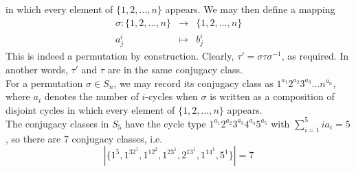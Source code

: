 \documentclass[a4paper]{article}
\begin{document}
\begin{ans}
in which every element of $\{1,2,\dots,n\}$ appears. We may then define a mapping 
\begin{eqnarray}
\sigma:\{1,2,\dots,n\}&\rightarrow&\{1,2,\dots,n\}\nonumber\\a_j^i&\mapsto& b_j^i\nonumber
\end{eqnarray}
This is indeed a permutation by construction. Clearly, $\tau'=\sigma\tau\sigma^{-1}$, as required. In another words, $\tau'$ and $\tau$ are in the same conjugacy class.\\[5pt]
For a permutation $\sigma\in S_n$, we may record its conjugacy class as $1^{a_1}2^{a_2}3^{a_3}\dots n^{a_n}$, where $a_i$ denotes the number of $i$-cycles when $\sigma$ is written as a composition of disjoint cycles in which every element of $\{1,2,\dots,n\}$ appears.\\[5pt]
The conjugacy classes in $S_5$ have the cycle type $1^{a_1}2^{a_2}3^{a_3}4^{a_4}5^{a_5}$ with $\sum_{i=1}^5ia_i=5$, so there are 7 conjugacy classes, i.e.
$$|\{1^5,1^32^1,1^12^2,1^23^1,2^13^1,1^14^1,5^1\}|=7$$
\end{ans}
\end{document}
